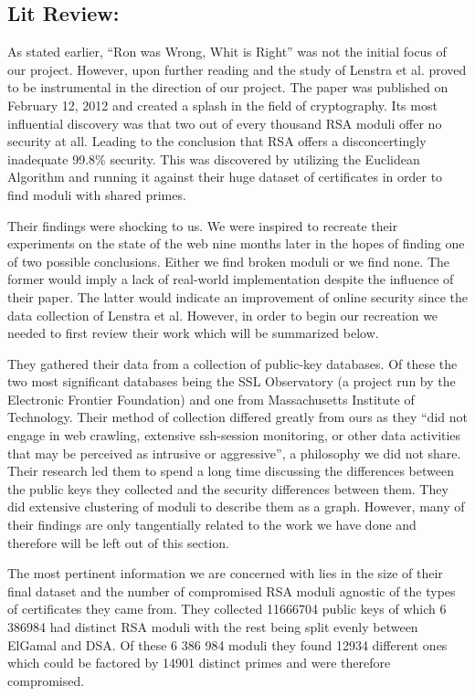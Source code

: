\documentclass[11pt,twoside]{article}
\begin{document}
\begin{multicols}{2}
\section{Lit Review:}
As stated earlier, ``Ron was Wrong, Whit is Right'' was not the initial focus of
our project. However, upon further reading and the study of Lenstra et al.
proved to be instrumental in the direction of our project. The paper was
published on February 12, 2012 and created a splash in the field of
cryptography. Its most influential discovery was that two out of every thousand
RSA moduli offer no security at all. Leading to the conclusion that RSA offers a
disconcertingly inadequate 99.8\% security. This was discovered by utilizing the
Euclidean Algorithm and running it against their huge dataset of certificates in
order to find moduli with shared primes.

Their findings were shocking to us. We were inspired to recreate their
experiments on the state of the web nine months later in the hopes of finding
one of two possible conclusions. Either we find broken moduli or we find none.
The former would imply a lack of real-world implementation despite the influence
of their paper. The latter would indicate an improvement of online security
since the data collection of Lenstra et al. However, in order to begin our
recreation we needed to first review their work which will be summarized below.

They gathered their data from a collection of public-key databases. Of these the
two most significant databases being the SSL Observatory (a project run by the
Electronic Frontier Foundation) and one  from Massachusetts Institute of
Technology. Their method of collection differed greatly from ours as they ``did
not engage in web crawling, extensive ssh-session monitoring, or other data
activities that may be perceived as intrusive or aggressive'', a philosophy we
did not share. Their research led them to spend a long time discussing the
differences between the public keys they collected and the security differences
between them. They did extensive clustering of moduli to describe them as a
graph. However, many of their findings are only tangentially related to the work
we have done and therefore will be left out of this section.

The most pertinent information we are concerned with lies in the size of their
final dataset and the number of compromised RSA moduli agnostic of the types of
certificates they came from. They collected 11666704 public keys of which 6
386984 had distinct RSA moduli with the rest being split evenly between ElGamal
and DSA. Of these 6 386 984 moduli they found 12934 different ones which could
be factored by 14901 distinct primes and were therefore compromised.



\end{multicols}
\end{document}
